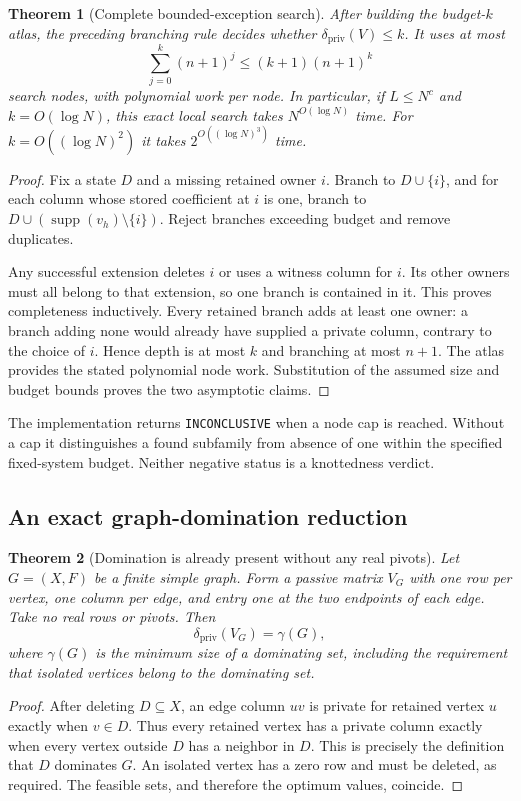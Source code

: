 \documentclass[11pt,letterpaper]{article}
\newtheorem{theorem}{Theorem}[section]
\theoremstyle{definition}
\newcommand{\supp}{\operatorname{supp}}
\newcommand{\dpriv}{\delta_{\mathrm{priv}}}
\begin{document}
\begin{theorem}[Complete bounded-exception search]\label{thm:search}
After building the budget-$k$ atlas, the preceding branching rule decides whether $\dpriv(V)\le k$. It uses at most
\[
 \sum_{j=0}^{k}(n+1)^j\le(k+1)(n+1)^k
\]
search nodes, with polynomial work per node. In particular, if $L\le N^c$ and $k=O(\log N)$, this exact local search takes $N^{O(\log N)}$ time. For $k=O((\log N)^2)$ it takes $2^{O((\log N)^3)}$ time.
\end{theorem}
\begin{proof}
Fix a state $D$ and a missing retained owner $i$. Branch to $D\cup\{i\}$, and for each column whose stored coefficient at $i$ is one, branch to $D\cup(\supp(v_h)\setminus\{i\})$. Reject branches exceeding budget and remove duplicates.

Any successful extension deletes $i$ or uses a witness column for $i$. Its other owners must all belong to that extension, so one branch is contained in it. This proves completeness inductively. Every retained branch adds at least one owner: a branch adding none would already have supplied a private column, contrary to the choice of $i$. Hence depth is at most $k$ and branching at most $n+1$. The atlas provides the stated polynomial node work. Substitution of the assumed size and budget bounds proves the two asymptotic claims.
\end{proof}

The implementation returns \texttt{INCONCLUSIVE} when a node cap is reached. Without a cap it distinguishes a found subfamily from absence of one within the specified fixed-system budget. Neither negative status is a knottedness verdict.

\subsection{An exact graph-domination reduction}
\begin{theorem}[Domination is already present without any real pivots]\label{thm:domination}
Let $G=(X,F)$ be a finite simple graph. Form a passive matrix $V_G$ with one row per vertex, one column per edge, and entry one at the two endpoints of each edge. Take no real rows or pivots. Then
\[
 \dpriv(V_G)=\gamma(G),
\]
where $\gamma(G)$ is the minimum size of a dominating set, including the requirement that isolated vertices belong to the dominating set.
\end{theorem}
\begin{proof}
After deleting $D\subseteq X$, an edge column $uv$ is private for retained vertex $u$ exactly when $v\in D$. Thus every retained vertex has a private column exactly when every vertex outside $D$ has a neighbor in $D$. This is precisely the definition that $D$ dominates $G$. An isolated vertex has a zero row and must be deleted, as required. The feasible sets, and therefore the optimum values, coincide.
\end{proof}
\end{document}
